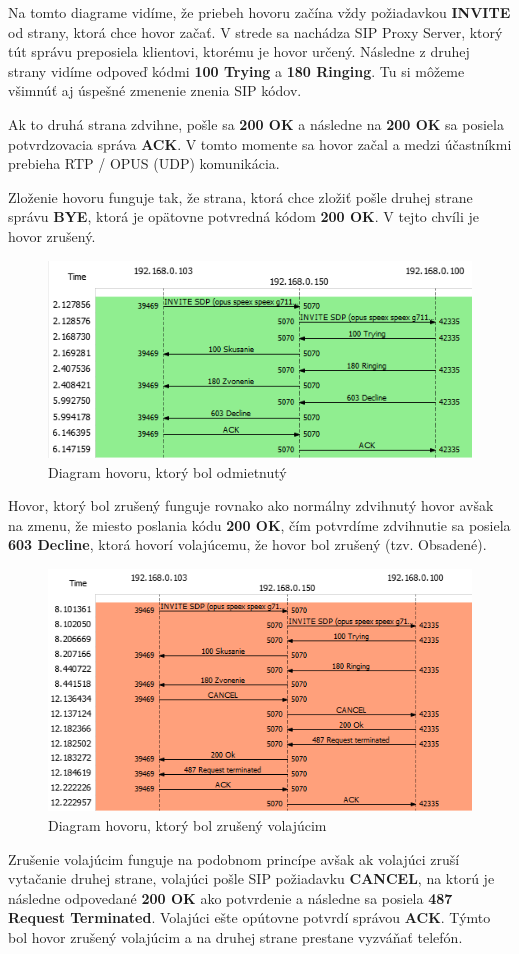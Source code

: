 \documentclass[10pt,oneside,slovak,a4paper]{article}
\begin{document}
Na tomto diagrame vidíme, že priebeh hovoru začína vždy požiadavkou \textbf{INVITE} od strany, ktorá chce hovor začať. V strede sa nachádza SIP Proxy Server, ktorý tút správu preposiela klientovi, ktorému je hovor určený. Následne z druhej strany vidíme odpoveď kódmi \textbf{100 Trying} a \textbf{180 Ringing}. Tu si môžeme všimnúť aj úspešné zmenenie znenia SIP kódov.

Ak to druhá strana zdvihne, pošle sa \textbf{200 OK} a následne na \textbf{200 OK} sa posiela potvrdzovacia správa \textbf{ACK}. V tomto momente sa hovor začal a medzi účastníkmi prebieha RTP / OPUS (UDP) komunikácia.

Zloženie hovoru funguje tak, že strana, ktorá chce zložiť pošle druhej strane správu \textbf{BYE}, ktorá je opätovne potvredná kódom \textbf{200 OK}. V tejto chvíli je hovor zrušený.

\begin{figure}[H]
	\centering
	\includegraphics[scale=0.8]{Decline.png}
	\caption{Diagram hovoru, ktorý bol odmietnutý}
\end{figure}
Hovor, ktorý bol zrušený funguje rovnako ako normálny zdvihnutý hovor avšak na zmenu, že miesto poslania kódu \textbf{200 OK}, čím potvrdíme zdvihnutie sa posiela \textbf{603 Decline}, ktorá hovorí volajúcemu, že hovor bol zrušený (tzv. Obsadené).

\begin{figure}[H]
	\centering
	\includegraphics[scale=0.8]{Cancelled.png}
	\caption{Diagram hovoru, ktorý bol zrušený volajúcim}
\end{figure}
Zrušenie volajúcim funguje na podobnom princípe avšak ak volajúci zruší vytačanie druhej strane, volajúci pošle SIP požiadavku \textbf{CANCEL}, na ktorú je následne odpovedané \textbf{200 OK} ako potvrdenie a následne sa posiela \textbf{487 Request Terminated}. Volajúci ešte opútovne potvrdí správou \textbf{ACK}. Týmto bol hovor zrušený volajúcim a na druhej strane prestane vyzváňať telefón.
\end{document}
